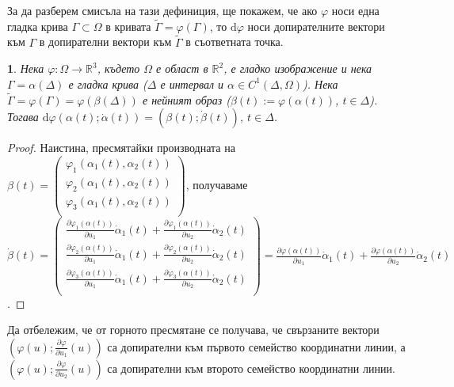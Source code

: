 \documentclass[11pt]{article}
\numberwithin{equation}{section}
\numberwithin{figure}{section}
\numberwithin{table}{section}
\theoremstyle{plain}
\theoremstyle{definition}
\theoremstyle{remark}
\theoremstyle{definition}
\theoremstyle{remark}
\theoremstyle{plain}
\newtheorem{lem}[thm]{\protect\lemmaname}
\theoremstyle{definition}
\theoremstyle{definition}
\theoremstyle{plain}
\theoremstyle{plain}
\theoremstyle{plain}
\theoremstyle{definition}
\theoremstyle{plain}
\providecommand{\lemmaname}{Лема}
\newcommand*{\R}{\mathbb{R}}
\begin{document}
 За да разберем смисъла на тази дефиниция, ще покажем, че ако $\varphi$ носи една гладка крива $\Gamma \subset\Omega$ в кривата $\tilde{\Gamma}=\varphi(\Gamma)$, то $\textrm{d}\varphi$ носи допирателните вектори към $\Gamma$ в допирателни вектори към $\tilde{\Gamma}$ в съответната точка.

\begin{lem}\label{diff_lines}
 Нека $\varphi : \Omega \longrightarrow \R^3$, където $\Omega$ е област в $\R^2$, е гладко изображение и нека $\Gamma=\alpha(\Delta)$ е гладка крива ($\Delta$ е интервал и $\alpha\in C^1(\Delta,\Omega)$). Нека $\tilde{\Gamma}=\varphi(\Gamma)=\varphi(\beta(\Delta))$ е нейният образ ($\beta(t):=\varphi(\alpha(t))$, $t\in \Delta$). Тогава $\textrm{d}\varphi(\alpha(t);\dot\alpha(t))=(\beta(t);\dot\beta(t))$, $t\in \Delta$.
\end{lem}
\begin{proof}
Наистина, пресмятайки производната на $\beta(t) = \begin{pmatrix}
	\varphi_1(\alpha_1(t),\alpha_2(t))\\
	\varphi_2(\alpha_1(t),\alpha_2(t))\\
	\varphi_3(\alpha_1(t),\alpha_2(t))\\
\end{pmatrix}$, получаваме $\dot\beta (t) = \begin{pmatrix}
	\frac{\partial \varphi_1(\alpha(t))}{\partial  u_1}\dot\alpha_1(t)+\frac{\partial \varphi_1(\alpha(t))}{\partial  u_2}\dot\alpha_2(t)\\
	\frac{\partial \varphi_2(\alpha(t))}{\partial  u_1}\dot\alpha_1 (t)+\frac{\partial \varphi_2(\alpha(t))}{\partial  u_2}\dot\alpha_2 (t)\\
	\frac{\partial \varphi_3(\alpha(t))}{\partial  u_1}\dot\alpha_1 (t)+\frac{\partial \varphi_3(\alpha(t))}{\partial  u_2}\dot\alpha_2 (t)\\
\end{pmatrix} = \frac{\partial \varphi(\alpha(t))}{\partial  u_1}\dot\alpha_1 (t)+\frac{\partial \varphi(\alpha(t))}{\partial  u_2}\dot\alpha_2 (t)$.
\end{proof}

Да отбележим, че от горното пресмятане се получава, че свързаните вектори \\$\left(\varphi(u);\frac{\partial\varphi}{\partial u_1}(u)\right)$ са допирателни към първото семейство координатни линии, а $\left(\varphi(u);\frac{\partial\varphi}{\partial u_2}(u)\right)$ са допирателни към второто семейство координатни линии.
\end{document}
